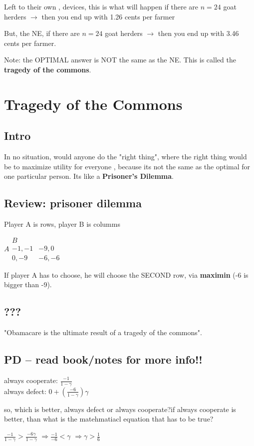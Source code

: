 \documentclass[12pt]{article}
\begin{document}
Left to their own , devices, this is what will happen if there are $n=24$ goat herders $\rightarrow$ then you end up with 1.26 cents per farmer

But, the NE, if there are $n=24$ goat herders $\rightarrow$ then you end up with 3.46 cents per farmer. 

Note: the OPTIMAL answer is NOT the same as the NE. This is called the \textbf{tragedy of the commons}.

\section{Tragedy of the Commons}
\subsection{Intro}
In no situation, would anyone do the "right thing", where the right thing would be to maximize utility for everyone , because its not the same as the optimal for one particular person. Its like a \textbf{Prisoner's Dilemma}. 



\subsection{Review: prisoner dilemma}
Player A is rows, player B is columms

$
A  
\begin{array}{|c|c}
	B \\
    \hline
  -1,-1 & -9,0\\
  \hline
  0,-9 & -6,-6
\end{array}
$

If player A has to choose, he will choose the SECOND row, via \textbf{maximin} (-6 is bigger than -9). 
 

\subsection{???}
"Obamacare is the ultimate result of a tragedy of the commons". 

\subsection{PD -- read book/notes for more info!!}
always cooperate: $\frac{-1}{1-\gamma}$\\
always defect: $0 + (\frac{-6}{1-\gamma})\gamma$

so, which is better, always defect or always cooperate?if always cooperate is better, than what is the matehmatiacl equation that has to be true?

$\frac{-1}{1-\gamma} > \frac{-6 \gamma}{1-\gamma}$
$\Rightarrow \frac{-1}{-6} < \gamma$
$\Rightarrow \gamma > \frac{1}{6}$
\end{document}
